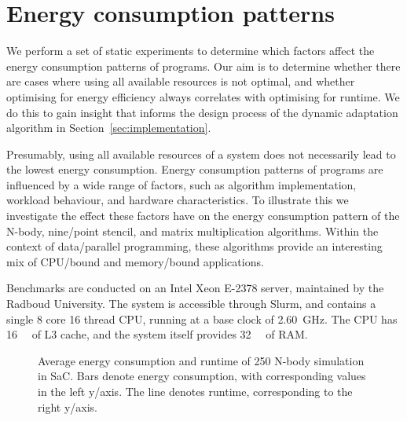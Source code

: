\section{Energy consumption patterns}\label{sec:observations}
We perform a set of static experiments to determine which factors affect the energy consumption patterns of programs.
Our aim is to determine whether there are cases where using all available resources is not optimal, and whether optimising for energy efficiency always correlates with optimising for runtime.
We do this to gain insight that informs the design process of the dynamic adaptation algorithm in Section~\ref{sec:implementation}.

Presumably, using all available resources of a system does not necessarily lead to the lowest energy consumption.
Energy consumption patterns of programs are influenced by a wide range of factors, such as algorithm implementation, workload behaviour, and hardware characteristics.
To illustrate this we investigate the effect these factors have on the energy consumption pattern of the N-body, nine\-/point stencil, and matrix multiplication algorithms.
Within the context of data\-/parallel programming, these algorithms provide an interesting mix of CPU\-/bound and memory\-/bound applications.

Benchmarks are conducted on an Intel Xeon E-2378 server, maintained by the Radboud University.
The system is accessible through Slurm, and contains a single \num{8} core \num{16} thread CPU, running at a base clock of \qty{2.60}{\giga\hertz}.
The CPU has \qty{16}{\mega\byte} of L3 cache, and the system itself provides \qty{32}{\giga\byte} of RAM.

\begin{figure}[ht]
  \scriptsize
  \begin{subfigure}{0.33\linewidth}
    \centering
  \end{subfigure}%
  \hfill
  \begin{subfigure}{0.33\linewidth}
    \centering
  \end{subfigure}%
  \hfill
  \begin{subfigure}{0.33\linewidth}
    \centering
  \end{subfigure}%
  \caption{Average energy consumption and runtime of 250 N-body simulation in SaC.
  Bars denote energy consumption, with corresponding values in the left y\-/axis.
  The line denotes runtime, corresponding to the right y\-/axis.}%
  \label{fig:nbody}
\end{figure}

